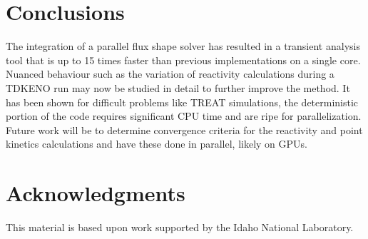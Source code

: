 \documentclass{anstrans}
\begin{document}
\section{Conclusions}
The integration of a parallel flux shape solver has resulted in a transient analysis tool that is up to 15 times faster than previous implementations on a single core.  Nuanced behaviour such as the variation of reactivity calculations during a TDKENO run may now be studied in detail to further improve the method.  It has been shown for difficult problems like TREAT simulations, the deterministic portion of the code requires significant CPU time and are ripe for parallelization. Future work will be to determine convergence criteria for the reactivity and point kinetics calculations and have these done in parallel, likely on GPUs. 


\section{Acknowledgments}
This material is based upon work supported by the Idaho National Laboratory.



\end{document}
